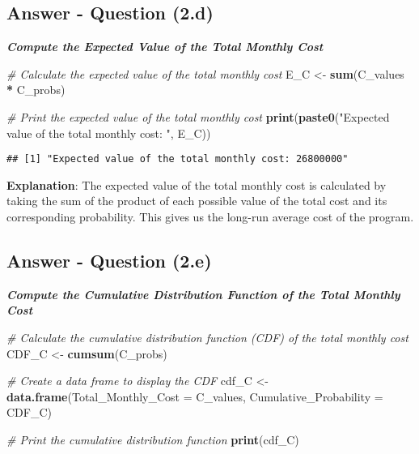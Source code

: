 \documentclass[
  11pt,
]{article}
\newenvironment{Shaded}{\begin{snugshade}}{\end{snugshade}}
\newcommand{\AttributeTok}[1]{\textcolor[rgb]{0.13,0.29,0.53}{#1}}
\newcommand{\CommentTok}[1]{\textcolor[rgb]{0.56,0.35,0.01}{\textit{#1}}}
\newcommand{\FunctionTok}[1]{\textcolor[rgb]{0.13,0.29,0.53}{\textbf{#1}}}
\newcommand{\NormalTok}[1]{#1}
\newcommand{\OtherTok}[1]{\textcolor[rgb]{0.56,0.35,0.01}{#1}}
\newcommand{\SpecialCharTok}[1]{\textcolor[rgb]{0.81,0.36,0.00}{\textbf{#1}}}
\newcommand{\StringTok}[1]{\textcolor[rgb]{0.31,0.60,0.02}{#1}}
\begin{document}
\subsection{Answer - Question (2.d)}\label{answer---question-2.d}

\textbf{\emph{Compute the Expected Value of the Total Monthly Cost}}

\begin{Shaded}
\begin{Highlighting}[]
\CommentTok{\# Calculate the expected value of the total monthly cost}
\NormalTok{E\_C }\OtherTok{\textless{}{-}} \FunctionTok{sum}\NormalTok{(C\_values }\SpecialCharTok{*}\NormalTok{ C\_probs)}

\CommentTok{\# Print the expected value of the total monthly cost}
\FunctionTok{print}\NormalTok{(}\FunctionTok{paste0}\NormalTok{(}\StringTok{"Expected value of the total monthly cost: "}\NormalTok{, E\_C))}
\end{Highlighting}
\end{Shaded}

\begin{verbatim}
## [1] "Expected value of the total monthly cost: 26800000"
\end{verbatim}

\textbf{Explanation}: The expected value of the total monthly cost is
calculated by taking the sum of the product of each possible value of
the total cost and its corresponding probability. This gives us the
long-run average cost of the program.

\subsection{Answer - Question (2.e)}\label{answer---question-2.e}

\textbf{\emph{Compute the Cumulative Distribution Function of the Total
Monthly Cost}}

\begin{Shaded}
\begin{Highlighting}[]
\CommentTok{\# Calculate the cumulative distribution function (CDF) of the total monthly cost}
\NormalTok{CDF\_C }\OtherTok{\textless{}{-}} \FunctionTok{cumsum}\NormalTok{(C\_probs)}

\CommentTok{\# Create a data frame to display the CDF}
\NormalTok{cdf\_C }\OtherTok{\textless{}{-}} \FunctionTok{data.frame}\NormalTok{(}\AttributeTok{Total\_Monthly\_Cost =}\NormalTok{ C\_values, }\AttributeTok{Cumulative\_Probability =}\NormalTok{ CDF\_C)}

\CommentTok{\# Print the cumulative distribution function}
\FunctionTok{print}\NormalTok{(cdf\_C)}
\end{Highlighting}
\end{Shaded}
\end{document}
